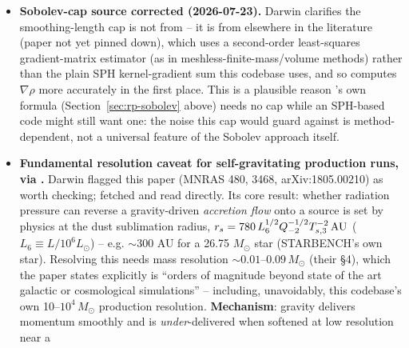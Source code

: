 \begin{itemize}
    different, uncoordinated distribution schemes. Proposed fix: exclude
    the ionizing band's energy from the $L_{\rm bol}$ used specifically
    in Eq.~\ref{eq:rp-momentum-rate}, and instead give momentum directly
    at the photoionization-tagging call site
    (), using the same per-particle
    ionizing flux T5's rate-coupling already computes there. Requires one
    new quantity not currently available: the ionizing band's
    \emph{energy} rate (not just $Q_H$, its \emph{number} rate) --
    $\dot E_{\rm ion} = Q_H\,(E_{\rm threshold}+\langle E_{\rm
    excess}\rangle)$, a straightforward combination of quantities T5
    already computes. Not yet implemented; queued behind Tier~1/Tier~2
    validation.
  \item \textbf{Sobolev-cap source corrected (2026-07-23).} Darwin
    clarifies the smoothing-length cap is not from \citet{Hopkins2020} --
    it is from elsewhere in the literature (paper not yet pinned down),
    which uses a second-order least-squares gradient-matrix estimator
    (as in meshless-finite-mass/volume methods) rather than the plain
    SPH kernel-gradient sum this codebase uses, and so computes
    $\nabla\rho$ more accurately in the first place. This is a plausible
    reason \citet{Hopkins2020}'s own formula (Section~\ref{sec:rp-sobolev}
    above) needs no cap while an SPH-based code might still want one:
    the noise this cap would guard against is method-dependent, not a
    universal feature of the Sobolev approach itself.
  \item \textbf{Fundamental resolution caveat for self-gravitating
    production runs, via \citet{Krumholz2018}.} Darwin flagged this
    paper (MNRAS 480, 3468, arXiv:1805.00210) as worth checking; fetched
    and read directly. Its core result: whether radiation pressure can
    reverse a gravity-driven \emph{accretion flow} onto a source is set
    by physics at the dust sublimation radius,
    $r_s = 780\,L_6^{1/2}Q_{-2}^{-1/2}T_{s,3}^{-2}\,{\rm AU}$
    ($L_6\equiv L/10^6 L_\odot$) -- e.g. $\sim$300 AU for a 26.75
    $M_\odot$ star (STARBENCH's own star). Resolving this needs mass
    resolution $\sim 0.01$--$0.09\,M_\odot$ (their \S4), which the paper
    states explicitly is ``orders of magnitude beyond state of the art
    galactic or cosmological simulations'' -- including, unavoidably,
    this codebase's own 10--$10^4\,M_\odot$ production resolution.
    \textbf{Mechanism}: gravity delivers momentum smoothly and is
    \emph{under}-delivered when softened at low resolution near a

\end{itemize}

